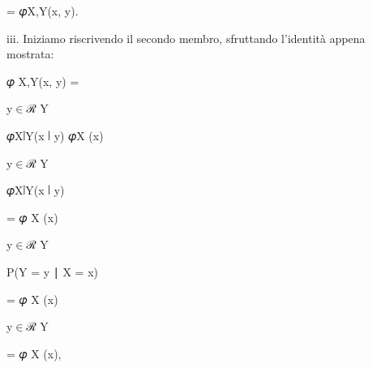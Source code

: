 \documentclass[a4paper,portrait,12pt]{article}
\begin{document}
\begin{flushleft}
= 𝜑X,Y(x, y).
\end{flushleft}


\begin{flushleft}
iii. Iniziamo riscrivendo il secondo membro, sfruttando l'identit\`{a} appena mostrata:
\end{flushleft}


\begin{flushleft}
𝜑 X,Y(x, y) =
\end{flushleft}


\begin{flushleft}
y$\in$ℛ Y
\end{flushleft}





\begin{flushleft}
𝜑X∣Y(x ∣ y) 𝜑X (x)
\end{flushleft}


\begin{flushleft}
y$\in$ℛ Y
\end{flushleft}





\begin{flushleft}
𝜑X∣Y(x ∣ y)
\end{flushleft}





\begin{flushleft}
= 𝜑 X (x)
\end{flushleft}


\begin{flushleft}
y$\in$ℛ Y
\end{flushleft}





\begin{flushleft}
P(Y = y ∣ X = x)
\end{flushleft}





\begin{flushleft}
= 𝜑 X (x)
\end{flushleft}


\begin{flushleft}
y$\in$ℛ Y
\end{flushleft}





\begin{flushleft}
= 𝜑 X (x),
\end{flushleft}
\end{document}
